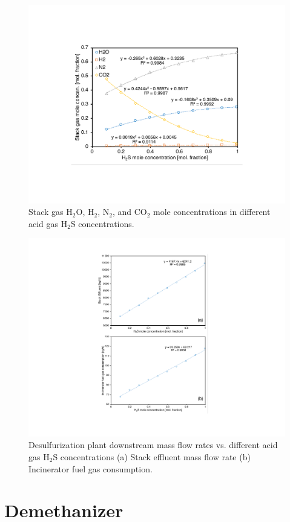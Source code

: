 \documentclass[11pt]{report}
\begin{document}
\begin{figure}
\includegraphics[width=0.8\columnwidth]{images/Claus_concent2.pdf}
\caption{Stack gas H$_2$O, H$_2$, N$_2$, and CO$_2$ mole concentrations in different acid gas H$_2$S concentrations.}
\label{fig:Claus_concent2}
\end{figure}

\begin{figure}
\includegraphics[width=0.8\columnwidth]{images/Claus_flowrates.pdf}
\caption{Desulfurization plant downstream mass flow rates vs. different acid gas H$_2$S concentrations (a) Stack effluent mass flow rate (b) Incinerator fuel gas consumption.}
\label{fig:Claus_flowrates}
\end{figure}

\clearpage

\section{Demethanizer}
\label{sec:demethanizer}
\end{document}
